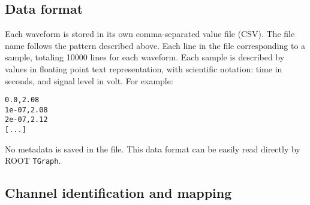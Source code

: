 \subsection{Data format}
\label{ssec:software:dataformats}

Each waveform is stored in its own comma-separated value file (CSV). The file name follows the pattern described above. Each line in the file corresponding to a sample, totaling 10000 lines for each waveform. Each sample is described by values in floating point text representation, with scientific notation: time in seconds, and signal level in volt. For example:

\begin{verbatim}
0.0,2.08
1e-07,2.08
2e-07,2.12
[...]
\end{verbatim}

No metadata is saved in the file. This data format can be easily read directly by ROOT \texttt{TGraph}.



\subsection{Channel identification and mapping}
\label{ssec:software:channelMapping}

